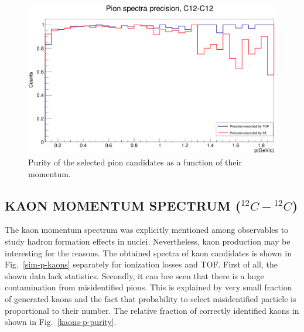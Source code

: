 \documentclass[12pt]{article}
\begin{document}
\begin{figure}[H]
\vspace{0.3cm}
	\centering
    \includegraphics[width=.6\textwidth]{PionSpectraPrecision_C12.png}
	\caption{Purity of the selected pion candidates as a function of their momentum.}
	\label{pions-p-purity}
\end{figure}

\clearpage

\subsection{KAON MOMENTUM SPECTRUM ($^{12}C-{^{12}C}$)}
The kaon momentum spectrum was explicitly mentioned among observables
to study hadron formation effects in nuclei. Nevertheless, kaon production may
be interesting for the reasons. The obtained spectra of kaon candidates is shown
in Fig.~\ref{sim-p-kaons} separately for ionization losses and TOF. First of all, the
shown data lack statistics. Secondly, it can bee seen that there is a huge contamination
from misidentified pions. This is explained by very small fraction of generated kaons
and the fact that probability to select misidentified particle is proportional to
their number. The relative fraction of correctly identified kaons in shown in Fig.~\ref{kaons-p-purity}.
\end{document}
